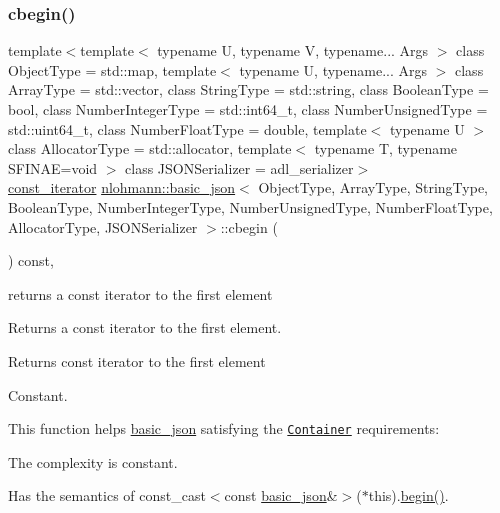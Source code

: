 \subsubsection{\texorpdfstring{cbegin()}{cbegin()}}
{\footnotesize\ttfamily template$<$template$<$ typename U, typename V, typename... Args $>$ class Object\+Type = std\+::map, template$<$ typename U, typename... Args $>$ class Array\+Type = std\+::vector, class String\+Type  = std\+::string, class Boolean\+Type  = bool, class Number\+Integer\+Type  = std\+::int64\+\_\+t, class Number\+Unsigned\+Type  = std\+::uint64\+\_\+t, class Number\+Float\+Type  = double, template$<$ typename U $>$ class Allocator\+Type = std\+::allocator, template$<$ typename T, typename S\+F\+I\+N\+A\+E=void $>$ class J\+S\+O\+N\+Serializer = adl\+\_\+serializer$>$ \\
\mbox{\hyperlink{classnlohmann_1_1basic__json_a41a70cf9993951836d129bb1c2b3126a}{const\+\_\+iterator}} \mbox{\hyperlink{classnlohmann_1_1basic__json}{nlohmann\+::basic\+\_\+json}}$<$ Object\+Type, Array\+Type, String\+Type, Boolean\+Type, Number\+Integer\+Type, Number\+Unsigned\+Type, Number\+Float\+Type, Allocator\+Type, J\+S\+O\+N\+Serializer $>$\+::cbegin (\begin{DoxyParamCaption}{ }\end{DoxyParamCaption}) const\hspace{0.3cm}{\ttfamily [inline]}, {\ttfamily [noexcept]}}



returns a const iterator to the first element 

Returns a const iterator to the first element.

 \begin{DoxyReturn}{Returns}
const iterator to the first element
\end{DoxyReturn}
Constant.

This function helps {\ttfamily \mbox{\hyperlink{classnlohmann_1_1basic__json}{basic\+\_\+json}}} satisfying the \href{https://en.cppreference.com/w/cpp/named_req/Container}{\tt Container} requirements\+:
\begin{DoxyItemize}
\item The complexity is constant.
\item Has the semantics of {\ttfamily const\+\_\+cast$<$const \mbox{\hyperlink{classnlohmann_1_1basic__json}{basic\+\_\+json}}\&$>$($\ast$this).\mbox{\hyperlink{classnlohmann_1_1basic__json_a0ff28dac23f2bdecee9564d07f51dcdc}{begin()}}}.
\end{DoxyItemize}

